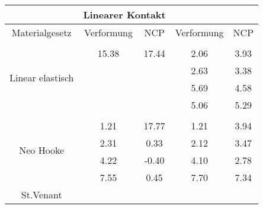 \begin{table} 
\centering 
\begin{tabular}{c|cc|cc|} 
\cline{2-5} 
 & \multicolumn{2}{|c|}{Linearer Kontakt} &  \\ 
\hline 
\multicolumn{1}{|c|}{Materialgesetz} & \multicolumn{1}{c|}{Verformung} & \multicolumn{1}{c|}{NCP} & \multicolumn{1}{c|}{Verformung} & \multicolumn{1}{c|}{NCP} \\ 
\hline 
\multicolumn{1}{|c|}{\multirow{5}{*}{Linear elastisch}} &\multicolumn{1}{|c|}{} & \multicolumn{1}{|c|}{} & \multicolumn{1}{|c|}{} & \multicolumn{1}{|c|}{} \\ 
\multicolumn{1}{|c|}{} & \multicolumn{1}{|c|}{     15.38} & \multicolumn{1}{|c|}{     17.44} & \multicolumn{1}{|c|}{      2.06} & \multicolumn{1}{|c|}{      3.93} \\ 
\multicolumn{1}{|c|}{} & \multicolumn{1}{|c|}{} & \multicolumn{1}{|c|}{} & \multicolumn{1}{|c|}{      2.63} & \multicolumn{1}{|c|}{      3.38} \\ 
\multicolumn{1}{|c|}{} & \multicolumn{1}{|c|}{} & \multicolumn{1}{|c|}{} & \multicolumn{1}{|c|}{      5.69} & \multicolumn{1}{|c|}{      4.58} \\ 
\multicolumn{1}{|c|}{} & \multicolumn{1}{|c|}{} & \multicolumn{1}{|c|}{} & \multicolumn{1}{|c|}{      5.06} & \multicolumn{1}{|c|}{      5.29} \\ 
\hline 
\multicolumn{1}{|c|}{\multirow{5}{*}{Neo Hooke}} &\multicolumn{1}{|c|}{} & \multicolumn{1}{|c|}{} & \multicolumn{1}{|c|}{} & \multicolumn{1}{|c|}{} \\ 
\multicolumn{1}{|c|}{} & \multicolumn{1}{|c|}{      1.21} & \multicolumn{1}{|c|}{     17.77} & \multicolumn{1}{|c|}{      1.21} & \multicolumn{1}{|c|}{      3.94} \\ 
\multicolumn{1}{|c|}{} & \multicolumn{1}{|c|}{      2.31} & \multicolumn{1}{|c|}{      0.33} & \multicolumn{1}{|c|}{      2.12} & \multicolumn{1}{|c|}{      3.47} \\ 
\multicolumn{1}{|c|}{} & \multicolumn{1}{|c|}{      4.22} & \multicolumn{1}{|c|}{     -0.40} & \multicolumn{1}{|c|}{      4.10} & \multicolumn{1}{|c|}{      2.78} \\ 
\multicolumn{1}{|c|}{} & \multicolumn{1}{|c|}{      7.55} & \multicolumn{1}{|c|}{      0.45} & \multicolumn{1}{|c|}{      7.70} & \multicolumn{1}{|c|}{      7.34} \\ 
\hline 
\multicolumn{1}{|c|}{\multirow{6}{*}{St.Venant}} &\multicolumn{1}{|c|}{} & \multicolumn{1}{|c|}{} & \multicolumn{1}{|c|}{} & \multicolumn{1}{|c|}{} \\ 

\end{tabular}
\end{table}
